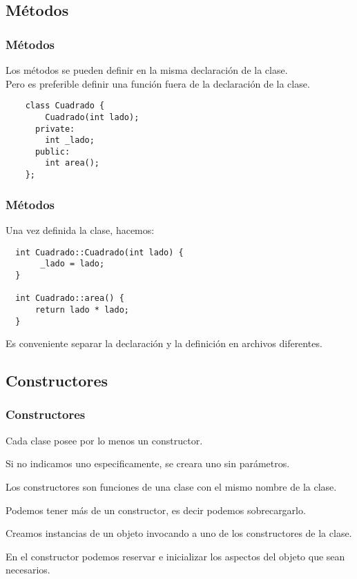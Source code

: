 \documentclass{beamer}
\begin{document}
\subsection{Métodos}
\begin{frame}[fragile]
\frametitle{Métodos}
   Los métodos se pueden definir en la misma declaración de la clase. \\
   Pero es preferible definir una función fuera de la declaración de la clase. 
   \begin{verbatim}
    class Cuadrado {
        Cuadrado(int lado);
      private:
        int _lado;
      public:
        int area();
    };
\end{verbatim}
\end{frame}

\begin{frame}[fragile]
\frametitle{Métodos}
   
   Una vez definida la clase, hacemos:
\begin{verbatim}
  int Cuadrado::Cuadrado(int lado) {
       _lado = lado;
  }

  int Cuadrado::area() {
      return lado * lado;
  }
\end{verbatim}

\begin{block}
Es conveniente separar la declaración y la definición en archivos diferentes.
\end{block}
\end{frame}

\subsection{Constructores}

\begin{frame}[fragile]
\frametitle{Constructores}

Cada clase posee por lo menos un constructor.

Si no indicamos uno especificamente, se creara uno sin parámetros.

Los constructores son funciones de una clase con el mismo nombre de la clase.

Podemos tener más de un constructor, es decir podemos sobrecargarlo.

Creamos instancias de un objeto invocando a uno de los constructores de la clase.

En el constructor podemos reservar e inicializar los aspectos del objeto que sean necesarios.

\end{frame}
\end{document}

